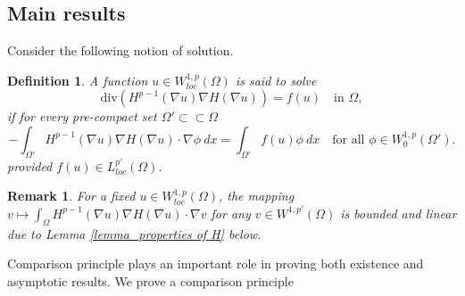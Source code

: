 \documentclass[11pt]{amsart}
\newtheorem{definition}[theorem]{Definition}
\newtheorem{remark}{Remark}
\newcommand{\D}{\nabla}
\newcommand{\Fin}[1]{H^{p-1}(\nabla #1)\nabla H(\nabla #1)}
\numberwithin{equation}{section}
\begin{document}
\subsection{Main results}
Consider the following notion of solution.
\begin{definition}\label{dfn solution}
    A function $u\in W_{loc}^{1,p}(\Omega)$ is said to solve 
    \begin{equation}\label{finsler eqn}
         \text{div}\left(H^{p-1}(\nabla u)\nabla H(\nabla u)\right)=f(u)\quad \text{in }\Omega,
    \end{equation}
    if for every pre-compact set $\Omega'\subset\subset \Omega$ 
    \begin{equation*}
        -\int_{\Omega'}\Fin{u}\cdot \D \phi\ dx=\int_{\Omega'}f(u)\phi\ dx \quad \text{for all }\phi\in W_{0}^{1,p}(\Omega').
    \end{equation*}
    provided $f(u)\in L_{loc}^{p'}(\Omega)$.
\end{definition}
\begin{remark}
    For a fixed $u\in W_{loc}^{1,p}(\Omega)$, the mapping $v\mapsto \int_{\Omega}\Fin{u}\cdot \nabla v $ for any $v\in W^{1,p'}(\Omega)$ is bounded and linear   due to Lemma \ref{lemma_properties of H} below.
\end{remark}

Comparison principle plays an important role in proving both existence and asymptotic results. We prove a comparison principle 
\end{document}
